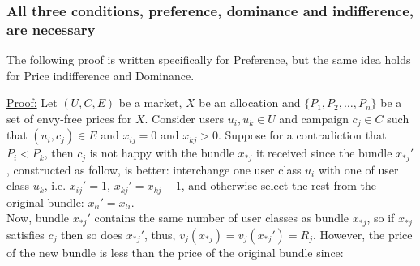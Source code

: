 \documentclass[12pt,letterpaper]{article}
\newcommand{\Campaign}{c}
\newcommand{\CampaignIndex}{j}
\newcommand{\Campaigns}{C}
\newcommand{\User}{u}
\newcommand{\Users}{U}
\newcommand{\Reward}{R}
\newcommand{\Edges}{E}
\newcommand{\Price}{P}
\newcommand{\AllocationMatrix}{X}
\newcommand{\AllocationMatrixEntry}{x}
\begin{document}
\subsubsection*{All three conditions, preference, dominance and indifference, are necessary}

The following proof is written specifically for Preference, but the same idea holds for Price indifference and Dominance.

\underline{Proof:} Let $(\Users,\Campaigns,\Edges)$ be a market, $\AllocationMatrix$ be an allocation and $\{\Price_1,\Price_2,\ldots,\Price_n\}$ be a set of envy-free prices for $\AllocationMatrix$. 
		    Consider users $\User_i,\User_k \in  \Users$ and campaign $\Campaign_j \in \Campaigns$ such that $(\User_i, \Campaign_j) \in \Edges$
		    and $\AllocationMatrixEntry_{ij} = 0$ and $\AllocationMatrixEntry_{kj} > 0$. Suppose for a contradiction that $\Price_i <  \Price_k$, then $\Campaign_j$ is not happy with the bundle $\AllocationMatrixEntry_{*\CampaignIndex}$
		    it received since the bundle $\AllocationMatrixEntry_{*\CampaignIndex}'$, constructed as follow, is better: 
		     interchange one user class $\User_i$ with one of user class $\User_k$, i.e. $\AllocationMatrixEntry_{ij}'=1$, $\AllocationMatrixEntry_{kj}' = \AllocationMatrixEntry_{kj}-1$, and
		     otherwise select the rest from the original bundle: $\AllocationMatrixEntry_{li}' = \AllocationMatrixEntry_{li}$.\\
		     Now, bundle $\AllocationMatrixEntry_{*\CampaignIndex}'$ contains the same number of user classes as bundle $\AllocationMatrixEntry_{*\CampaignIndex}$, so if $\AllocationMatrixEntry_{*\CampaignIndex}$ satisfies $\Campaign_j$ then so does $\AllocationMatrixEntry_{*\CampaignIndex}'$, thus,
		     $v_j\left(\AllocationMatrixEntry_{*\CampaignIndex}\right) = v_j\left(\AllocationMatrixEntry_{*\CampaignIndex}'\right) = \Reward_j$. 
		     However, the price of the new bundle is less than the price of the original bundle since:
\end{document}
